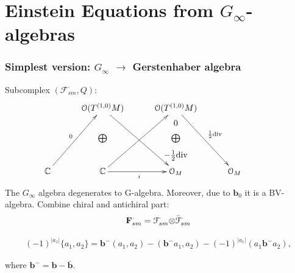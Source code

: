 \documentclass[9pt]{beamer}
\begin{document}
\section[Einstein Equations]{Einstein Equations from $G_{\infty}$-algebras }

\begin{frame}[t]
\frametitle{Simplest version: $G_{\infty}$ $\to$ Gerstenhaber algebra}
Subcomplex $(\mathcal{F}^{\cdot}_{sm}, Q)$:
\begin{eqnarray*}
\xymatrixcolsep{30pt}
\xymatrixrowsep{3pt}
\xymatrix{
& \mathcal{O}(T^{(1,0)}M)\ar[ddddr] & \mathcal{O}(T^{(1,0)}M)\ar[ddddr]^{\frac{1}{2}{\rm div}}& \\
&& 0 &&\\
& \bigoplus & \bigoplus & \\
&& {-\frac{1}{2}{\rm div}} &&\\
\mathbb{C}\ar[uuuur]^{0} & \mathbb{C}\ar[uuuur]\ar[r]_{i} & \mathcal{O}_M  & \mathcal{O}_M
}
\end{eqnarray*}
The $G_{\infty}$ algebra degenerates to G-algebra. Moreover, due to $\mathbf{b}_0$ it is a BV-algebra.
Combine chiral and antichiral part:
\begin{eqnarray*}
{\bf F}^{\cdot}_{sm}=\mathcal{F}^{\cdot}_{sm}{\otimes}\bar {\mathcal{F}}^{\cdot}_{sm} 
\end{eqnarray*}

\begin{eqnarray*}\label{brack2}
(-1)^{|a_1|}\{a_1,a_2\}=
\mathbf{b^-}(a_1,a_2)-(\mathbf{b^-}a_1,a_2)-(-1)^{|a_1|}(a_1\mathbf{b^-}a_2)\nonumber,
\end{eqnarray*}

where $\mathbf{b^-}=\mathbf{b}-\bar{\mathbf{b}}$.

\end{frame}
\end{document}
